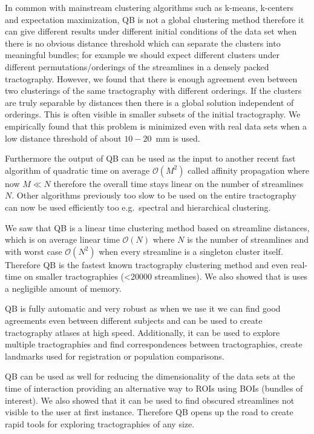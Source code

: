 \documentclass{bioinfo}
\begin{document}
In common with mainstream clustering algorithms such as k-means,
k-centers and expectation maximization, QB is not a global clustering
method therefore it can give different results under different initial
conditions of the data set when there is no obvious distance threshold
which can separate the clusters into meaningful bundles; for example we
should expect different clusters under different permutations/orderings
of the streamlines in a densely packed tractography. However, we found
that there is enough agreement even between two clusterings of the same
tractography with different orderings. If the clusters are truly
separable by distances then there is a global solution independent of
orderings. This is often visible in smaller subsets of the initial
tractography. We empirically found that this problem is minimized even
with real data sets when a low distance threshold of about $10-20$~mm is
used.

Furthermore the output of QB can be used as the input to another recent
fast algorithm of quadratic time on average $\mathcal{O}(M^{2})$ called
affinity propagation where now $M\ll N$ therefore the overall time stays
linear on the number of streamlines $N$. Other algorithms previously too
slow to be used on the entire tractography can now be used efficiently
too e.g.~spectral and hierarchical clustering.

We saw that QB is a linear time clustering method based on streamline
distances, which is on average linear time $\mathcal{O}(N)$ where $N$ is
the number of streamlines and with worst case $\mathcal{O}(N^{2})$ when
every streamline is a singleton cluster itself. Therefore QB is the
fastest known tractography clustering method and even real-time on
smaller tractographies (<\num{20000} streamlines). We also showed that
is uses a negligible amount of memory.

QB is fully automatic and very robust as when we use it we can find good
agreements even between different subjects and can be used to create
tractography atlases at high speed. Additionally, it can be used to
explore multiple tractographies and find correspondences between
tractographies, create landmarks used for registration or population
comparisons.

QB can be used as well for reducing the dimensionality of the data sets
at the time of interaction providing an alternative way to ROIs using
BOIs (bundles of interest). We also showed that it can be used to find
obscured streamlines not visible to the user at first
instance. Therefore QB opens up the road to create rapid tools for
exploring tractographies of any size.
\end{document}
